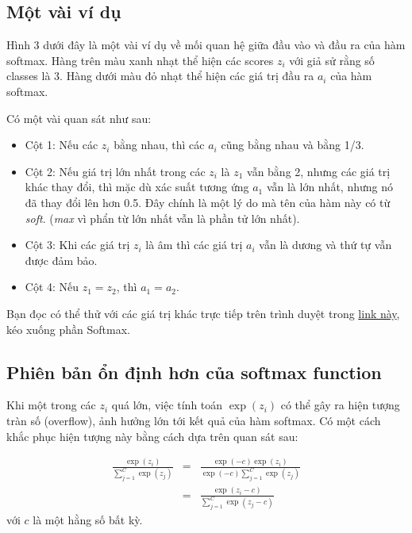  
\subsection{Một vài ví dụ }
 
Hình 3 dưới đây là một vài ví dụ về mối quan hệ giữa đầu vào và đầu ra của hàm softmax. Hàng trên màu xanh nhạt thể hiện các scores $z_i$ với giả sử rằng số classes là 3. Hàng dưới màu đỏ nhạt thể hiện các giá trị đầu ra $a_i$ của hàm softmax. 
 
 
Có một vài quan sát như sau:  

\begin{itemize}
    \item Cột 1: Nếu các $z_i$ bằng nhau, thì các $a_i$ cũng bằng nhau và bằng 1/3.  
     
    \item Cột 2: Nếu giá trị lớn nhất trong các $z_i$ là $z_1$ vẫn bằng 2, nhưng các giá trị khác thay đổi, thì mặc dù xác suất tương ứng $a_1$ vẫn là lớn nhất, nhưng nó đã thay đổi lên hơn 0.5. Đây chính là một lý do mà tên của hàm này có từ \textit{soft}. (\textit{max} vì phẩn từ lớn nhất vẫn là phần tử lớn nhất). 
     
    \item Cột 3: Khi các giá trị $z_i$ là âm thì các giá trị $a_i$ vẫn là dương và thứ tự vẫn được đảm bảo.  
     
    \item Cột 4: Nếu $z_1 = z_2$, thì $a_1 = a_2$. 
\end{itemize}
 
Bạn đọc có thể thử với các giá trị khác trực tiếp trên trình duyệt trong \href{http://neuralnetworksanddeeplearning.com/chap3.html}{link này}, kéo xuống phần Softmax.  
 
 
\subsection{Phiên bản ổn định hơn của softmax function }
 
Khi một trong các $z_i$ quá lớn, việc tính toán $\exp(z_i)$ có thể gây ra hiện tượng tràn số (overflow), ảnh hưởng lớn tới kết quả của hàm softmax. Có một cách khắc phục hiện tượng này bằng cách dựa trên quan sát sau:  
 
\begin{eqnarray*}
\frac{\exp(z_i)}{\sum_{j=1}^C \exp(z_j)} &=& \frac{\exp(-c)\exp(z_i)}{\exp(-c)\sum_{j=1}^C \exp(z_j)}\\\ 
&=& \frac{\exp(z_i-c)}{\sum_{j=1}^C \exp(z_j-c)} 
\end{eqnarray*}
với $c$ là một hằng số bất kỳ.  
 
